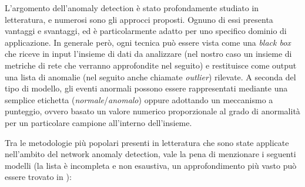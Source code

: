 \documentclass[12pt,a4paper,cucitura]{toptesi}
\begin{document}
L'argomento dell'anomaly detection è stato profondamente studiato in letteratura, e numerosi sono gli approcci proposti.
Ognuno di essi presenta vantaggi e svantaggi, ed è particolarmente adatto per uno specifico dominio di applicazione.
In generale però, ogni tecnica può essere vista come una \emph{black box} che riceve in input l'insieme di dati da analizzare (nel nostro caso un insieme di metriche di rete che verranno approfondite nel seguito) e restituisce come output una lista di anomalie (nel seguito anche chiamate \emph{outlier}) rilevate.
A seconda del tipo di modello, gli eventi anormali possono essere rappresentati mediante una semplice etichetta (\emph{normale}/\emph{anomalo}) oppure adottando un meccanismo a punteggio, ovvero basato un valore numerico proporzionale al grado di anormalità per un particolare campione all'interno dell'insieme.

Tra le metodologie più popolari presenti in letteratura che sono state applicate nell'ambito del network anomaly detection, vale la pena di menzionare i seguenti modelli (la lista è incompleta e non esaustiva, un approfondimento più vasto può essere trovato in \cite{survey}):
\end{document}
